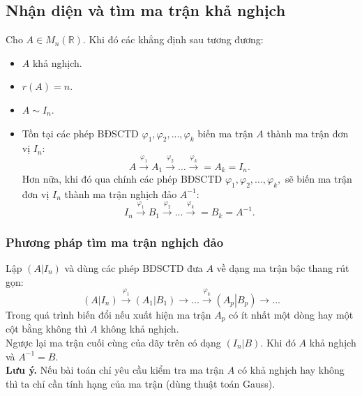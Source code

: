 \subsection{Nhận diện và tìm ma trận khả nghịch}
\begin{mybox}
\begin{theorem}
Cho $A \in M_n \left( {\mathbb{R}} \right).$ Khi đó các khẳng định sau tương đương:
\begin{itemize}
\item $A$ khả nghịch.
\item $r \left( A \right) = n.$
\item $A \sim I_n.$
\item Tồn tại các phép BĐSCTD $\varphi_1, \varphi_2, ..., \varphi_k$ biến ma trận $A$ thành ma trận đơn vị $I_n:$
$$A\mathop  \to \limits^{{\varphi _1}} {A_1}\mathop  \to \limits^{{\varphi _2}} ...\mathop  \to \limits^{{\varphi _k}}  = {A_k} = I_n.$$
Hơn nữa, khi đó qua chính các phép BĐSCTD $\varphi_1, \varphi_2, ..., \varphi_k,$ sẽ biến ma trận đơn vị $I_n$ thành ma trận nghịch đảo $A^{-1}:$
$$I_n\mathop  \to \limits^{{\varphi _1}} {B_1}\mathop  \to \limits^{{\varphi _2}} ...\mathop  \to \limits^{{\varphi _k}}  = {B_k} = A^{-1}.$$
\end{itemize}
\end{theorem}
\end{mybox}
\subsubsection{Phương pháp tìm ma trận nghịch đảo}
Lập $\left( {\left. A \right|{I_n}} \right)$ và dùng các phép BĐSCTD đưa $A$ về dạng ma trận bậc thang rút gọn:
$$\left( {\left. A \right|{I_n}} \right)\mathop  \to \limits^{{\varphi _1}} \left( {\left. {{A_1}} \right|{B_1}} \right) \to ...\mathop  \to \limits^{{\varphi _k}} \left( {\left. {{A_p}} \right|{B_p}} \right) \to ...$$
Trong quá trình biến đổi nếu xuất hiện ma trận $A_p$ có ít nhất một dòng hay một cột bằng không thì $A$ không khả nghịch.\\
Ngược lại ma trận cuối cùng của dãy trên có dạng $\left( {\left. {{I_n}} \right|B} \right).$ Khi đó $A$ khả nghịch và $A^{-1} = B.$\\
\textbf{Lưu ý.} Nếu bài toán chỉ yêu cầu kiểm tra ma trận $A$ có khả nghịch hay không thì ta chỉ cần tính hạng của ma trận (dùng thuật toán Gauss).
